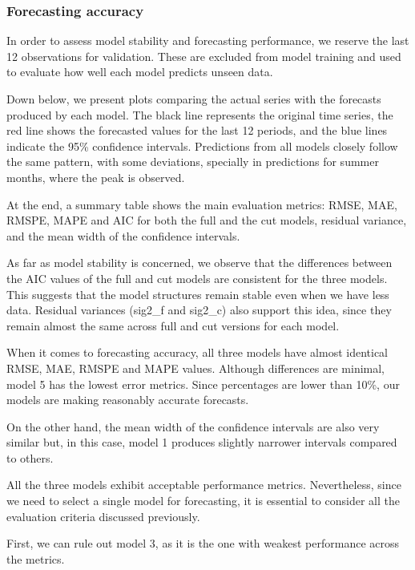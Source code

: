 \documentclass[
]{article}
\begin{document}
\hypertarget{forecasting-accuracy}{%
\subsubsection{Forecasting accuracy}\label{forecasting-accuracy}}

In order to assess model stability and forecasting performance, we
reserve the last 12 observations for validation. These are excluded from
model training and used to evaluate how well each model predicts unseen
data.

Down below, we present plots comparing the actual series with the
forecasts produced by each model. The black line represents the original
time series, the red line shows the forecasted values for the last 12
periods, and the blue lines indicate the 95\% confidence intervals.
Predictions from all models closely follow the same pattern, with some
deviations, specially in predictions for summer months, where the peak
is observed.

At the end, a summary table shows the main evaluation metrics: RMSE,
MAE, RMSPE, MAPE and AIC for both the full and the cut models, residual
variance, and the mean width of the confidence intervals.

As far as model stability is concerned, we observe that the differences
between the AIC values of the full and cut models are consistent for the
three models. This suggests that the model structures remain stable even
when we have less data. Residual variances (sig2\_f and sig2\_c) also
support this idea, since they remain almost the same across full and cut
versions for each model.

When it comes to forecasting accuracy, all three models have almost
identical RMSE, MAE, RMSPE and MAPE values. Although differences are
minimal, model 5 has the lowest error metrics. Since percentages are
lower than 10\%, our models are making reasonably accurate forecasts.

On the other hand, the mean width of the confidence intervals are also
very similar but, in this case, model 1 produces slightly narrower
intervals compared to others.

All the three models exhibit acceptable performance metrics.
Nevertheless, since we need to select a single model for forecasting, it
is essential to consider all the evaluation criteria discussed
previously.

First, we can rule out model 3, as it is the one with weakest
performance across the metrics.
\end{document}

